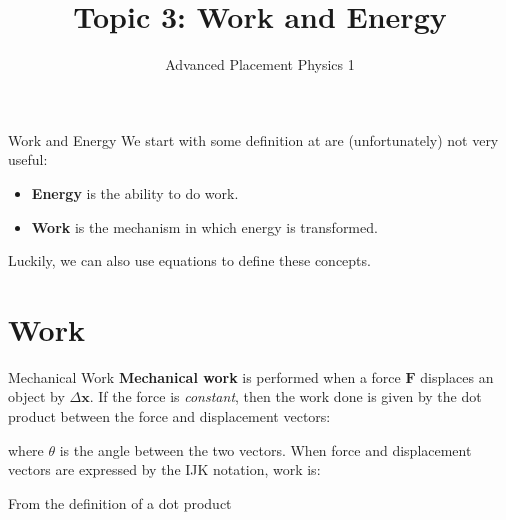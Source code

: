 \documentclass[12pt,compress,aspectratio=169]{beamer}
\title{Topic 3: Work and Energy}
\subtitle{Advanced Placement Physics 1}
\begin{document}
\begin{frame}
  \maketitle
\end{frame}




\begin{frame}{Work and Energy}
  We start with some definition at are (unfortunately) not very useful:
  \begin{itemize}
    \item \textbf{Energy} is the ability to do work.
    \item \textbf{Work} is the mechanism in which energy is transformed.
  \end{itemize}
  Luckily, we can also use equations to define these concepts.
\end{frame}


\section{Work}

\begin{frame}{Mechanical Work}
  \textbf{Mechanical work} is performed when a force $\bm{F}$ displaces an
  object by $\Delta \bm{x}$. If the force is \emph{constant}, then the work
  done is given by the dot product between the force and displacement vectors:


  \vspace{-.15in}where $\theta$ is the angle between the two vectors. When
  force and displacement vectors are expressed by the IJK notation, work is:


  From the definition of a dot product
\end{frame}
\end{document}

